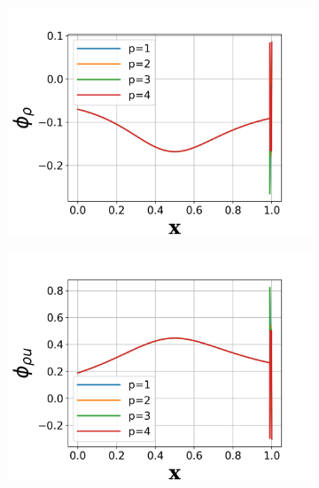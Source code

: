 \documentclass[a4paper]{article}
\begin{document}
\begin{figure}[!htbp]
  \centering
  \begin{subfigure}{0.45\textwidth}
    \centering
    \includegraphics[width=1.0\linewidth]{figures/J2_phi_1.png}
    \label{fig:j2_phi1}
  \end{subfigure}
  \begin{subfigure}{0.45\textwidth}
    \centering
    \includegraphics[width=1.0\linewidth]{figures/J2_phi_2.png}
    \label{fig:j2_phi2}
  \end{subfigure}
  \begin{subfigure}{0.45\textwidth}
    \centering

\end{subfigure}
\end{figure}
\end{document}
